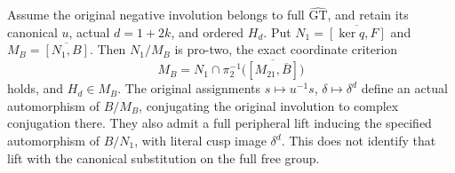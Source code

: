 Assume the original negative involution belongs to full \(\widehat{\mathrm{GT}}\),
and retain its canonical \(u\), actual \(d=1+2k\), and ordered \(H_d\).
Put \(N_1=\overline{[\ker q,F]}\) and \(M_B=\overline{[N_1,B]}\).
Then \(N_1/M_B\) is pro-two, the exact coordinate criterion
\[
 M_B=N_1\cap\pi_2^{-1}\bigl(\overline{[M_{21},\overline B]}\bigr)
\]
holds, and \(H_d\in M_B\). The original assignments
\(s\mapsto u^{-1}s\), \(\delta\mapsto\delta^d\) define an
actual automorphism of \(B/M_B\), conjugating the original involution
to complex conjugation there. They also admit a full peripheral
lift inducing the specified automorphism of \(B/N_1\), with literal
cusp image \(\delta^d\). This does not identify that lift with the
canonical substitution on the full free group.
